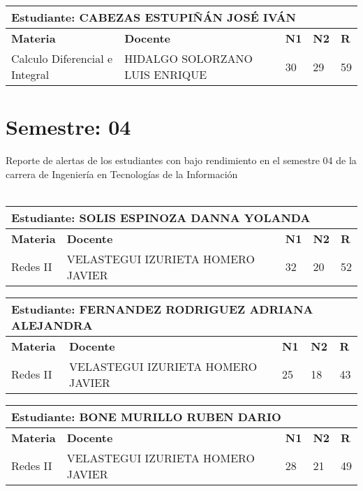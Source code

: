 \small
\begin{tabularx}{\textwidth}{|p{5cm}|p{7cm}|X|X|X|}
\hline
\multicolumn{5}{|p{\dimexpr\textwidth-2\tabcolsep-2\arrayrulewidth}|}{\textbf{Estudiante: CABEZAS ESTUPIÑÁN JOSÉ IVÁN }}\\\hline
\textbf{Materia} & \textbf{Docente} & \textbf{N1} & \textbf{N2} & \textbf{R} \\ \hline
Calculo Diferencial e Integral & HIDALGO SOLORZANO LUIS ENRIQUE  & 30 & 29& 59 \\ \hline
\end{tabularx}\vspace{10mm}
\section{Semestre: 04}
        Reporte de alertas de los estudiantes con bajo rendimiento en el semestre 04 de la carrera de 
        Ingeniería en Tecnologías de la Información\\\\\small
\begin{tabularx}{\textwidth}{|p{5cm}|p{7cm}|X|X|X|}
\hline
\multicolumn{5}{|p{\dimexpr\textwidth-2\tabcolsep-2\arrayrulewidth}|}{\textbf{Estudiante: SOLIS ESPINOZA DANNA YOLANDA }}\\\hline
\textbf{Materia} & \textbf{Docente} & \textbf{N1} & \textbf{N2} & \textbf{R} \\ \hline
Redes II & VELASTEGUI IZURIETA HOMERO JAVIER  & 32 & 20& 52 \\ \hline
\end{tabularx}\vspace{10mm}
\small
\begin{tabularx}{\textwidth}{|p{5cm}|p{7cm}|X|X|X|}
\hline
\multicolumn{5}{|p{\dimexpr\textwidth-2\tabcolsep-2\arrayrulewidth}|}{\textbf{Estudiante: FERNANDEZ RODRIGUEZ ADRIANA ALEJANDRA }}\\\hline
\textbf{Materia} & \textbf{Docente} & \textbf{N1} & \textbf{N2} & \textbf{R} \\ \hline
Redes II & VELASTEGUI IZURIETA HOMERO JAVIER  & 25 & 18& 43 \\ \hline
\end{tabularx}\vspace{10mm}
\small
\begin{tabularx}{\textwidth}{|p{5cm}|p{7cm}|X|X|X|}
\hline
\multicolumn{5}{|p{\dimexpr\textwidth-2\tabcolsep-2\arrayrulewidth}|}{\textbf{Estudiante: BONE MURILLO RUBEN DARIO }}\\\hline
\textbf{Materia} & \textbf{Docente} & \textbf{N1} & \textbf{N2} & \textbf{R} \\ \hline
Redes II & VELASTEGUI IZURIETA HOMERO JAVIER  & 28 & 21& 49 \\ \hline
\end{tabularx}\vspace{10mm}
